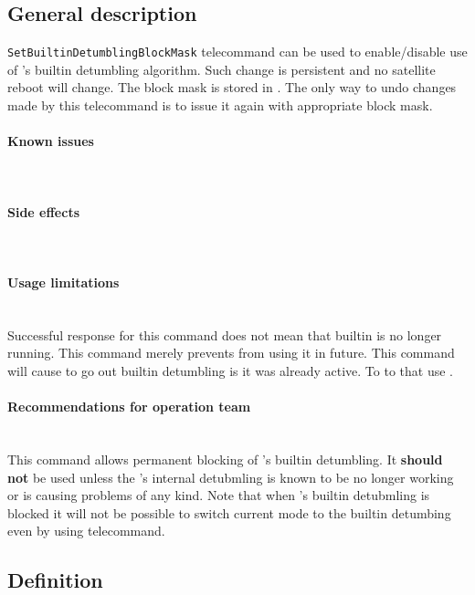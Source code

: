 
\subsection{General description}
\texttt{SetBuiltinDetumblingBlockMask} telecommand can be used to enable/disable use of 
\Imtq's builtin detumbling algorithm. Such change is persistent and no satellite reboot 
will change. The block mask is stored in . The only 
way to undo changes made by this telecommand is to issue it again with appropriate 
block mask.

\paragraph{Known issues} \mbox{} \\
\None

\paragraph{Side effects} \mbox{} \\
\None

\paragraph{Usage limitations} \mbox{} \\
Successful response for this command does not mean that builtin is no longer running. 
This command merely prevents \OBC from using it in future. This command will cause \OBC
to go out builtin detumbling is it was already active. To to that use .

\paragraph{Recommendations for operation team} \mbox{} \\
This command allows permanent blocking of \Imtq's builtin detumbling. It \textbf{should not} 
be used unless the \Imtq's internal detubmling is known to be no longer working or is causing
problems of any kind. 
Note that when \Imtq's builtin detubmling is blocked it will not be possible to switch 
current \Adcs mode to the builtin detumbing even by using  telecommand.

\subsection{Definition}

